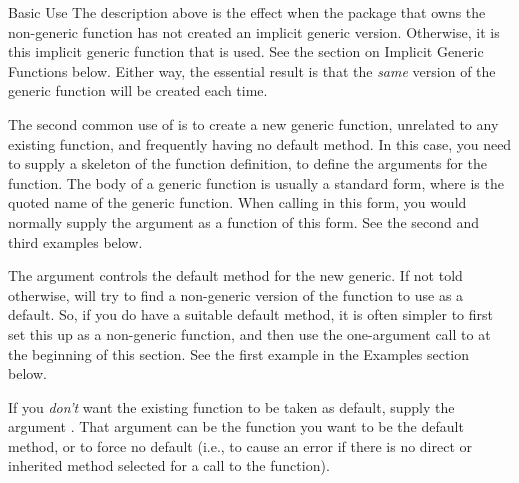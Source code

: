\begin{Section}{Basic Use}
The description above is the effect when the package that owns the non-generic function has not created an implicit generic version.  Otherwise, it is this implicit generic function that is used. See the section on Implicit Generic Functions below.  Either way, the essential result is that the \emph{same} version of the  generic function will be created each time.

The second common use of   is to create a new generic
function, unrelated to any existing function, and frequently having no default method.  In this case, you
need to supply a skeleton of the function definition, to define the
arguments for the function.  The body of a generic function is
usually a standard form,  where
 is the quoted name of the generic function.
When calling  in this form, you would normally
supply the  argument as a function of this form.  See the second and third examples below.

The  argument controls the default method for the new generic.
If not
told otherwise,  will try to find a non-generic
version of the function to use as a default.
So, if you do have a suitable default method, it is often simpler to first set this up as a non-generic function, and then use the one-argument call to  at the beginning of this section.   See the first example in the Examples section below.

If you \emph{don't} want the existing function to be taken as default, supply the argument .  That argument
can be the function you want to be the default method, or
 to force no default (i.e., to cause an error if
there is no direct or inherited method selected for a call to the function).
\end{Section}
%
